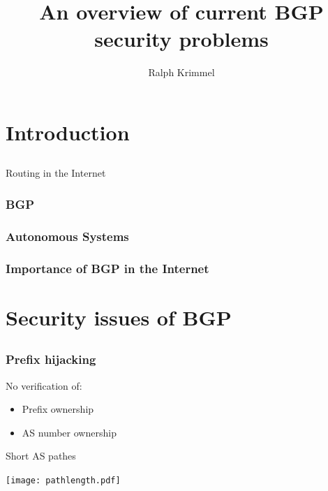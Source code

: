 \documentclass[notes=hide,yellow]{beamer}
\title{An overview of current BGP security problems}
\subtitle{ }
\author{Ralph Krimmel}
\begin{document}
	\begin{frame}
		\titlepage
	\end{frame}

	\begin{frame}
		\tableofcontents
	\end{frame}

\section{ Introduction}
\subsection*{}

\begin{frame}{Routing in the Internet}
\end{frame}

\begin{frame}
	\frametitle{BGP}
\end{frame}

\begin{frame}
	\frametitle{Autonomous Systems}

\end{frame}

\begin{frame}
	\frametitle{Importance of BGP in the Internet}
\end{frame}

\section{Security issues of BGP}
\subsection*{}
\begin{frame}
	\frametitle{Prefix hijacking}
		
	\begin{block}{No verification of:}
		\begin{itemize}
			\item Prefix ownership
			\item AS number ownership
		\end{itemize}
	\end{block}
\end{frame}

\begin{frame}{Short AS pathes}
	\begin{center}
		\texttt{[image: pathlength.pdf]}
	\end{center}
\end{frame}
\end{document}
